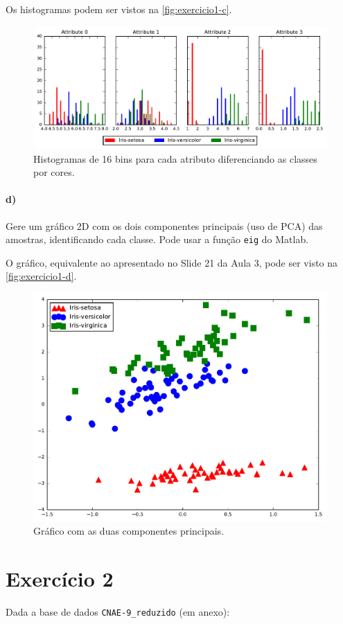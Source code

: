\documentclass{article}
\begin{document}
Os histogramas podem ser vistos na \autoref{fig:exercicio1-c}.

\begin{figure}[h]
	\centering
	\includegraphics[width=\linewidth]{exercicio1-c.pdf}
	\caption{Histogramas de 16 bins para cada atributo diferenciando as classes por cores.}
	\label{fig:exercicio1-c}
\end{figure}


\paragraph{d)} Gere um gráfico 2D com os dois componentes principais (uso de PCA) das amostras, identificando cada classe. Pode usar a função \texttt{eig} do Matlab.

O gráfico, equivalente ao apresentado no Slide 21 da Aula 3, pode ser visto na \autoref{fig:exercicio1-d}.

\begin{figure}[h!]
	\centering
	\includegraphics[width=0.5\linewidth]{exercicio1-d.pdf}
	\caption{Gráfico com as duas componentes principais.}
	\label{fig:exercicio1-d}
\end{figure}

\section{Exercício 2}

Dada a base de dados \texttt{CNAE-9\_reduzido} (em anexo):
\end{document}
